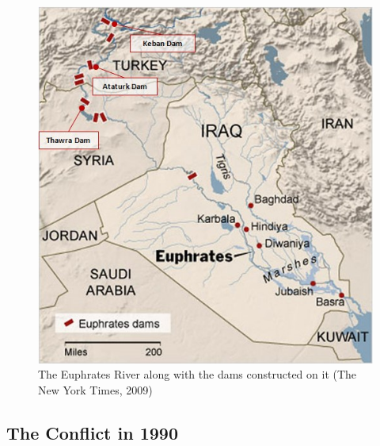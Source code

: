 \documentclass[letterpaper,12pt,titlepage,oneside,final]{book}
\begin{document}
\begin{center}
\begin{figure}[h]
\centering
\includegraphics[scale=.6]{PDF-IMG/dams.jpg}

\caption{The Euphrates River along with the dams constructed on it (The New York Times, 2009)}

\label{fig:dams}
\end{figure}
\end{center}

\subsection{The Conflict in 1990}
\end{document}
